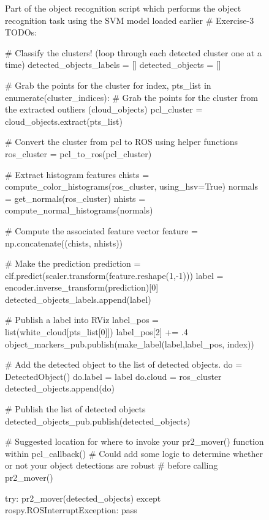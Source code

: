 \documentclass[a4paper]{article}
\begin{document}
\begin{figure}[h]\scriptsize
\begin{sexylisting}{Part of the object recognition script which performs the object recognition task using the SVM model loaded earlier}
# Exercise-3 TODOs:

    # Classify the clusters! (loop through each detected cluster one at a time)
    detected_objects_labels = []
    detected_objects = []

    # Grab the points for the cluster
    for index, pts_list in enumerate(cluster_indices):
        # Grab the points for the cluster from the extracted outliers (cloud_objects)
        pcl_cluster = cloud_objects.extract(pts_list)

        # Convert the cluster from pcl to ROS using helper functions
        ros_cluster = pcl_to_ros(pcl_cluster)

        # Extract histogram features
        chists = compute_color_histograms(ros_cluster, using_hsv=True)
        normals = get_normals(ros_cluster)
        nhists = compute_normal_histograms(normals)

        # Compute the associated feature vector
        feature = np.concatenate((chists, nhists))

        # Make the prediction
        prediction = clf.predict(scaler.transform(feature.reshape(1,-1)))
        label = encoder.inverse_transform(prediction)[0]
        detected_objects_labels.append(label)

        # Publish a label into RViz
        label_pos = list(white_cloud[pts_list[0]])
        label_pos[2] += .4
        object_markers_pub.publish(make_label(label,label_pos, index))

        # Add the detected object to the list of detected objects.
        do = DetectedObject()
        do.label = label
        do.cloud = ros_cluster
        detected_objects.append(do)

        # Publish the list of detected objects
        detected_objects_pub.publish(detected_objects)

        # Suggested location for where to invoke your pr2_mover() function within pcl_callback()
        # Could add some logic to determine whether or not your object detections are robust
        # before calling pr2_mover()

    try:
        pr2_mover(detected_objects)
    except rospy.ROSInterruptException:
        pass
\end{sexylisting}
\end{figure}
\clearpage
\end{document}
